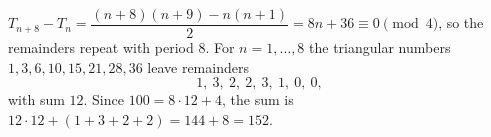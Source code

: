 $T_{n+8}-T_n=\dfrac{(n+8)(n+9)-n(n+1)}{2}=8n+36\equiv0\pmod4$, so the remainders repeat with period $8$. For $n=1,\dots,8$ the triangular numbers $1,3,6,10,15,21,28,36$ leave remainders
\[
1,\ 3,\ 2,\ 2,\ 3,\ 1,\ 0,\ 0,
\]
with sum $12$. Since $100=8\cdot12+4$, the sum is $12\cdot12+(1+3+2+2)=144+8=\boxed{152}$.
